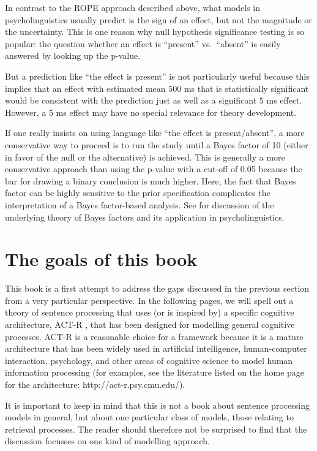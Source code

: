 \documentclass{cambridge7A}\usepackage[]{graphicx}\usepackage[]{color}
\begin{document}
In contrast to the ROPE approach described above, what models in psycholinguistics usually predict is the sign of an effect, but not the magnitude or the uncertainty. This is one reason why  null hypothesis significance testing is so popular: the question whether an effect is ``present'' vs.\ ``absent'' is easily answered by looking up the  p-value. 

But a prediction like ``the effect is present'' is not particularly useful because this implies that an effect with estimated mean $500$ ms that is statistically significant would be consistent with the prediction just as well as a significant $5$ ms effect. However, a 5 ms effect may have no special relevance for theory development.

If one really insists on using language like ``the effect is present/absent'', a more conservative way to proceed is to run the study until a Bayes factor of 10 (either in favor of the null or the alternative) is achieved. This is generally a more conservative approach than using the p-value with a cut-off of 0.05 because the bar for drawing a binary conclusion is much higher. Here, the fact that Bayes factor can be highly sensitive to the prior specification complicates the interpretation of a Bayes factor-based analysis.
See \cite{NicenboimVasishthStatMeth,NicenboimEtAlBayes2019} for discussion of the underlying theory of Bayes factors and its application in psycholinguistics.

\section{The goals of this book}

This book is a first attempt to address the gaps discussed in the previous section from a very particular perspective.
In the following pages, we will spell out a theory of
sentence processing \citep{LewisVasishth2005} that uses (or is inspired by) a specific cognitive
architecture,  ACT-R \citep{AndersonEtAl2004}, that has been designed for
modelling general cognitive processes. ACT-R is a reasonable choice
for a framework because it is a mature architecture that has been
widely used in artificial intelligence, human-computer interaction,
psychology, and other areas of cognitive science to model human
information processing (for examples, see the literature listed on the home page for the architecture: http://act-r.psy.cmu.edu/). 

It is important to keep in mind that this is not a book about sentence processing models in general, but about one particular class of models, those relating to retrieval processes. The reader should therefore not be surprised to find that the discussion focusses on one kind of modelling approach. 
\end{document}
